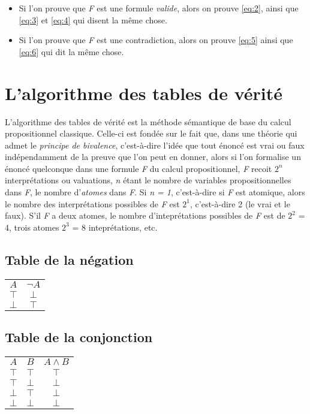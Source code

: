 \documentclass[article,reqno,times,12pt,french]{smfart}
\begin{document}
\begin{rema}
\begin{itemize}
\item Si l'on  prouve que \emph{F}  est une  formule \emph{valide}, alors  on prouve
\eqref{eq:2}, ainsi  que \eqref{eq:3} et  \eqref{eq:4} qui disent  la même
chose.
\item Si  l'on prouve  que  \emph{F}  est une  contradiction,  alors on  prouve
\eqref{eq:5} ainsi que \eqref{eq:6} qui dit la même chose.
\end{itemize}
\end{rema}
\section{L'algorithme des tables de vérité}
\label{sec:org28fc6a1}
L'algorithme des tables de vérité est la méthode sémantique de base du
calcul propositionnel classique. Celle-ci est  fondée sur le fait que,
dans une  théorie qui  admet le  \emph{principe de  bivalence}, c'est-à-dire
l'idée que  tout énoncé est vrai  ou faux indépendamment de  la preuve
que l'on peut en donner, alors  si l'on formalise un énoncé quelconque
dans une  formule \emph{F} du  calcul propositionnel, \emph{F}  recoit \(2^{n}\)
interprétations  ou  valuations,  \emph{n}  étant le  nombre  de  variables
propositionnelles dans \emph{F}, le nombre d'\emph{atomes}  dans \emph{F}. Si \emph{n = 1},
c'est-à-dire si \emph{F} est atomique,  alors le nombre des interprétations
possibles de \emph{F}  est \(2^{1}\), c'est-à-dire 2 (le vrai  et le faux).
S'il \emph{F}  a deux atomes,  le nombre d'inteprétations possibles  de \emph{F}
est de \(2^{2}\) = 4, trois atomes \(2^{3}\) = 8 inteprétations, etc. 
\subsection{Table de la négation}
\label{sec:org96ceec5}
\begin{center}
\begin{tabular}{cc}
\(A\) & \(\lnot A\)\\
\(\top\) & \(\bot\)\\
\(\bot\) & \(\top\)\\
\end{tabular}
\end{center}
\subsection{Table de la conjonction}
\label{sec:orga20bbbe}
\begin{center}
\begin{tabular}{ccc}
\(A\) & \(B\) & \(A \land B\)\\
\(\top\) & \(\top\) & \(\top\)\\
\(\top\) & \(\bot\) & \(\bot\)\\
\(\bot\) & \(\top\) & \(\bot\)\\
\(\bot\) & \(\bot\) & \(\bot\)\\
\end{tabular}
\end{center}
\end{document}
